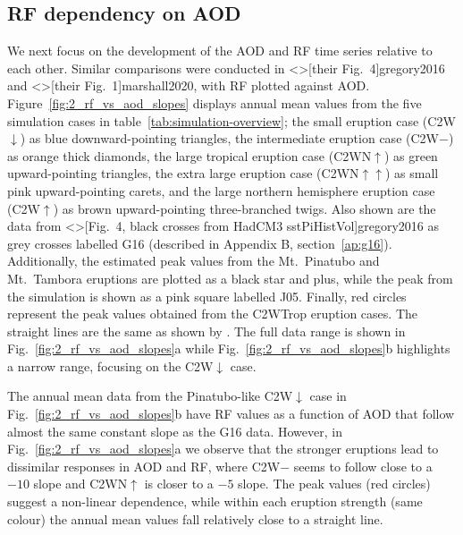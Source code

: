 \documentclass[draft]{agujournal2019}
\newcommand{\cwt}{C2WTrop}
\newcommand{\cwm}{C2W\(\downarrow\)}
\newcommand{\cwmp}{C2W\(-\)}
\newcommand{\cws}{C2WN\(\uparrow\)}
\newcommand{\cwss}{C2WN\(\uparrow\uparrow\)}
\newcommand{\cwsn}{C2W\(\uparrow\)}
\begin{document}
\subsection{RF dependency on AOD}

We next focus on the development of the AOD and RF time series relative to each other.
Similar comparisons were conducted in \citeA<>[their Fig.\ 4]{gregory2016} and
\citeA<>[their Fig.\ 1]{marshall2020}, with RF plotted against AOD.
Figure~\ref{fig:2_rf_vs_aod_slopes} displays annual mean values from the five simulation
cases in table~\ref{tab:simulation-overview}; the small eruption case (\cwm{}) as blue
downward-pointing triangles, the intermediate eruption case (\cwmp{}) as orange thick
diamonds, the large tropical eruption case (\cws{}) as green upward-pointing triangles,
the extra large eruption case (\cwss{}) as small pink upward-pointing carets, and the
large northern hemisphere eruption case (\cwsn{}) as brown upward-pointing
three-branched twigs. Also shown are the data from \citeA<>[Fig.\ 4, black crosses from
  HadCM3 sstPiHistVol]{gregory2016} as grey crosses labelled G16 (described in Appendix B,
section~\ref{ap:g16}). Additionally, the estimated peak values from the Mt.\ Pinatubo
and Mt.\ Tambora eruptions are plotted as a black star and plus, while the peak from the
 simulation is shown as a pink square labelled J05. Finally, red
circles represent the peak values obtained from the \cwt{} eruption cases. The straight
lines are the same as shown by . The full data range is shown in
Fig.~\ref{fig:2_rf_vs_aod_slopes}a while Fig.~\ref{fig:2_rf_vs_aod_slopes}b highlights a
narrow range, focusing on the \cwm{} case.

The annual mean data from the Pinatubo-like \cwm{} case in
Fig.~\ref{fig:2_rf_vs_aod_slopes}b have RF values as a function of AOD that follow
almost the same constant slope as the G16 data. However, in
Fig.~\ref{fig:2_rf_vs_aod_slopes}a we observe that the stronger eruptions lead to
dissimilar responses in AOD and RF, where \cwmp{} seems to follow close to a \(-10\)
slope and \cws{} is closer to a \(-5\) slope. The peak values (red circles) suggest a
non-linear dependence, while within each eruption strength (same colour) the annual mean
values fall relatively close to a straight line.
\end{document}
